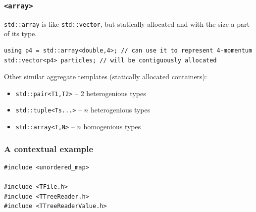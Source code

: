 \documentclass{beamer}
\begin{document}
\begin{frame}[fragile=singleslide]
\frametitle{\texttt{<array>}}

\vspace{-5mm}

\texttt{std::array} is like \texttt{std::vector}, but statically allocated and
with the size a part of its type.

\begin{verbatim}
using p4 = std::array<double,4>; // can use it to represent 4-momentum
std::vector<p4> particles; // will be contiguously allocated
\end{verbatim}

Other similar aggregate templates (statically allocated containers):
\begin{itemize}
  \item \texttt{std::pair<T1,T2>} -- 2 heterogenious types
    \href{http://en.cppreference.com/w/cpp/utility/pair}{
      }
  \item \texttt{std::tuple<Ts...>} -- $n$ heterogenious types
    \href{http://en.cppreference.com/w/cpp/utility/tuple}{
      }
  \item \texttt{std::array<T,N>} -- $n$ homogenious types
    \href{http://en.cppreference.com/w/cpp/container/array}{
      }
\end{itemize}
\end{frame}


\begin{frame}[fragile=singleslide]
\frametitle{A contextual example}

\vspace{-5mm}
\begin{verbatim}
#include <unordered_map>

#include <TFile.h>
#include <TTreeReader.h>
#include <TTreeReaderValue.h>

\end{verbatim}
\end{frame}

\end{document}

